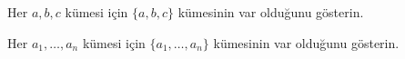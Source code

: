 \documentclass[../../../include/open-logic-section]{subfiles}
\begin{document}
\begin{prob}
Her $a,b,c$ kümesi için $\{a,b,c\}$ kümesinin var olduğunu gösterin.
\end{prob}

\begin{prob}
Her $a_1, \ldots, a_n$ kümesi için $\{a_1, \ldots, a_n\}$ kümesinin
var olduğunu gösterin.
\end{prob}

\end{document}
